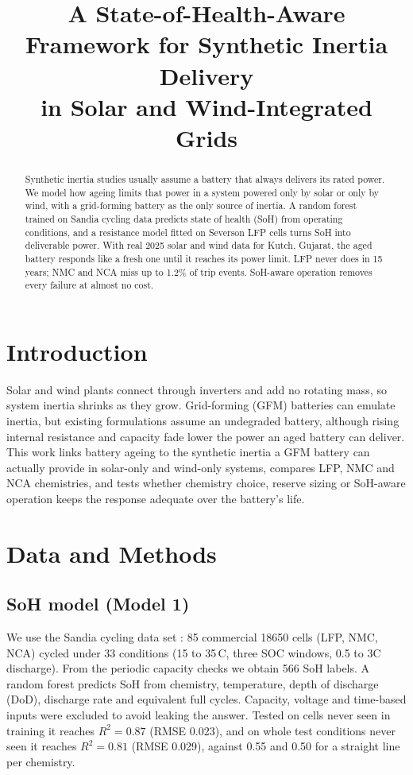 \documentclass[conference]{IEEEtran}
\begin{document}
\title{A State-of-Health-Aware Framework for Synthetic Inertia Delivery\\in Solar and Wind-Integrated Grids}

\author{
}

\maketitle

\begin{abstract}
Synthetic inertia studies usually assume a battery that always delivers its rated power. We model how ageing limits that power in a system powered only by solar or only by wind, with a grid-forming battery as the only source of inertia. A random forest trained on Sandia cycling data predicts state of health (SoH) from operating conditions, and a resistance model fitted on Severson LFP cells turns SoH into deliverable power. With real 2025 solar and wind data for Kutch, Gujarat, the aged battery responds like a fresh one until it reaches its power limit. LFP never does in 15 years; NMC and NCA miss up to 1.2\% of trip events. SoH-aware operation removes every failure at almost no cost.
\end{abstract}

\section{Introduction}
Solar and wind plants connect through inverters and add no rotating mass, so system inertia shrinks as they grow. Grid-forming (GFM) batteries can emulate inertia, but existing formulations assume an undegraded battery, although rising internal resistance and capacity fade lower the power an aged battery can deliver. This work links battery ageing to the synthetic inertia a GFM battery can actually provide in solar-only and wind-only systems, compares LFP, NMC and NCA chemistries, and tests whether chemistry choice, reserve sizing or SoH-aware operation keeps the response adequate over the battery's life.

\section{Data and Methods}
\subsection{SoH model (Model 1)}
We use the Sandia cycling data set \cite{preger2020}: 85 commercial 18650 cells (LFP, NMC, NCA) cycled under 33 conditions (15 to 35\,\textdegree C, three SOC windows, 0.5 to 3C discharge). From the periodic capacity checks we obtain 566 SoH labels. A random forest predicts SoH from chemistry, temperature, depth of discharge (DoD), discharge rate and equivalent full cycles. Capacity, voltage and time-based inputs were excluded to avoid leaking the answer. Tested on cells never seen in training it reaches $R^2 = 0.87$ (RMSE 0.023), and on whole test conditions never seen it reaches $R^2 = 0.81$ (RMSE 0.029), against 0.55 and 0.50 for a straight line per chemistry.
\end{document}
